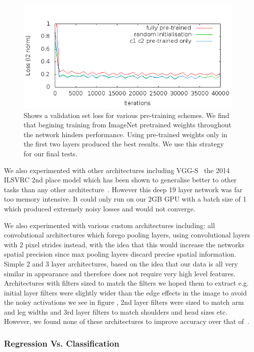 \documentclass[11pt]{article} %
\begin{document}
\begin{figure}
\centering
\includegraphics*[width=0.9\linewidth,clip]{AlexNetInitComploss.png} 
\caption{Shows a validation set loss for various pre-training schemes. We find that begining training from ImageNet pretrained weights throughout the network hinders performance. Using pre-trained weights only in the first two layers produced the best results. We use this strategy for our final tests. \label{fig:alexNetpre}}
\end{figure}

We also experimented with other architectures including VGG-S~\cite{Simonyan2015} the 2014 ILSVRC 2nd place model which has been shown to generalise better to other tasks than any other architecture~\cite{Chatfield2014}. However this deep 19 layer network was far too memory intensive. It could only run on our 2GB GPU with a batch size of 1 which produced extremely noisy losses and would not converge. 

We also experimented with various custom architectures including: all convolutional architectures which forego pooling layers, using convolutional layers with 2 pixel strides instead, with the idea that this would increase the networks spatial precision since max pooling layers discard precise spatial information. Simple 2 and 3 layer architectures, based on the idea that our data is all very similar in appearance and therefore does not require very high level features. Architectures with filters sized to match the filters we hoped them to extract e.g. initial layer filters were slightly wider than the edge effects in the image to avoid the noisy activations we see in figure \cite{fig:norm1}, 2nd layer filters were sized to match arm and leg widths and 3rd layer filters to match shoulders and head sizes etc. However, we found none of these architectures to improve accuracy over that of~\cite{Krizhevsky2012}. 


\subsubsection{Regression Vs. Classification}
\end{document}

